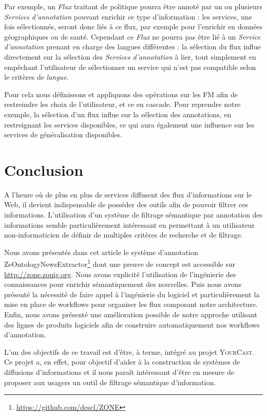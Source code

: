 \documentclass[]{easychair}
\newcommand{\Y}[0]{\textsc{YourCast}\xspace}
\begin{document}
Par exemple, un \textit{Flux} traitant de politique pourra être annoté par un ou plusieurs \textit{Services d'annotation} pouvant enrichir ce type d'information : les services, une fois sélectionnés, seront donc liés à ce flux, par exemple pour l'enrichir en données géographiques ou de santé. Cependant ce \textit{Flux} ne pourra pas être lié à un \textit{Service d'annotation} prenant en charge des langues différentes : la sélection du flux influe directement sur la sélection des \textit{Services d'annotation} à lier, tout simplement en empêchant l'utilisateur de sélectionner un service qui n'est pas compatible selon le critères de \textit{langue}.

Pour cela nous définissons et appliquons des opérations sur les FM \cite{Acher2011} afin de restreindre les choix de l'utilisateur, et ce en cascade. Pour reprendre notre exemple, la sélection d'un flux influe sur la sélection des annotations, en restreignant les services disponibles, ce qui aura également une influence sur les services de généralisation disponibles. 

\section{Conclusion}
\label{sect:conclusion}
A l'heure où de plus en plus de services diffusent des flux d'informations sur le Web, il devient indispensable de posséder des outils afin de pouvoir filtrer ces informations. L'utilisation d'un système de filtrage sémantique par annotation des informations semble particulièrement intéressant en permettant à un utilisateur non-informaticien de définir de multiples critères de recherche et de filtrage.

Nous avons présentés dans cet article le système d'annotation ZeOntologyNewsExtractor\footnote{\url{https://github.com/descl/ZONE}} dont une preuve de concept est accessible sur \url{http://zone.zouig.org}. Nous avons explicité l'utilisation de l'ingénierie des connaissances pour enrichir sémantiquement des nouvelles. Puis nous avons présenté la nécessité de faire appel à l'ingénierie du logiciel et particulièrement la mise en place de workflows pour organiser les flux composant notre architecture. Enfin, nous avons présenté une amélioration possible de notre approche utilisant des lignes de produits logiciels afin de construire automatiquement nos workflows d'annotation.

L'un des objectifs de ce travail est d'être, à terme, intégré au projet \Y. Ce projet a, en effet, pour objectif d'aider à la construction de systèmes de diffusions d'informations et il nous paraît intéressant d'être en mesure de proposer aux usagers un outil de filtrage sémantique d'information.
\end{document}
